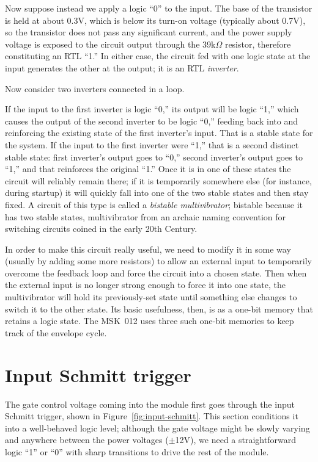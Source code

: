 Now suppose instead we apply a logic ``0'' to the input.  The base of the
transistor is held at about 0.3V, which is below its turn-on voltage (typically about
0.7V), so the transistor does not pass any significant current, and the
power supply voltage is exposed to the circuit output through the
39k$\Omega$ resistor, therefore constituting an RTL ``1.''  In either case,
the circuit fed with one logic state at the input generates the other at the
output; it is an RTL \emph{inverter}.

Now consider two inverters connected in a loop.

{\centering\par}

If the input to the first inverter is logic ``0,'' its output will be logic
``1,'' which causes the output of the second inverter to be logic ``0,''
feeding back into and reinforcing the existing state of the first inverter's
input.  That is a stable state for the system.  If the input to the first
inverter were ``1,'' that is a second distinct stable state:  first
inverter's output goes to ``0,'' second inverter's output goes to ``1,'' and
that reinforces the original ``1.''  Once it is in one of these states the
circuit will reliably remain there; if it is temporarily somewhere else (for
instance, during startup) it will quickly fall into one of the two stable
states and then stay fixed.  A circuit of this type is called a
\emph{bistable multivibrator}; bistable because it has two stable states,
multivibrator from an archaic naming convention for switching
circuits coined in the early 20th Century.

In order to make this circuit really useful, we need to modify it in some
way (usually by adding some more resistors) to allow an external input to
temporarily overcome the feedback loop and force the circuit into a chosen
state.  Then when the external input is no longer strong enough to force it
into one state, the multivibrator will hold its previously-set state until
something else changes to switch it to the other state.  Its basic
usefulness, then, is as a one-bit memory that retains a logic state.  The
MSK~012 uses three such one-bit memories to keep track of the envelope
cycle.

\section{Input Schmitt trigger}

The gate control voltage coming into the module first goes through the input
Schmitt trigger, shown in Figure~\ref{fig:input-schmitt}.  This section
conditions it into a well-behaved logic level; although the gate voltage
might be slowly varying and anywhere between the power voltages ($\pm$12V),
we need a straightforward logic ``1'' or ``0'' with sharp transitions to
drive the rest of the module.

